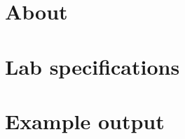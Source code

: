 
\newcommand{\laClass}       {CS 250}
\newcommand{\laSemester}    {Spring 2018}
\newcommand{\laChapter}     {}
\newcommand{\laType}        {Lab}
\newcommand{\laAssignment}  {1}
\newcommand{\laPoints}      {5}
\newcommand{\laTitle}       {Doing a thing}
\newcommand{\laStarterFiles}{Download from GitHub.}
\newcommand{\laTopics}      {Stuff, stuff, and stuff.}
\setcounter{chapter}{1}
\setcounter{section}{1}
\addtocounter{section}{-1}
\toggletrue{answerkey}
\togglefalse{answerkey}





    \section{About}

    \section{Lab specifications}

    \section{Example output}


